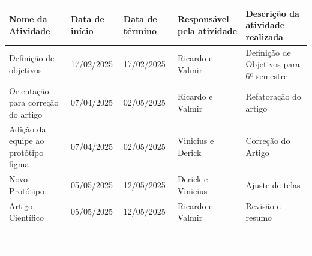 \documentclass[
landscape,
  a4paper,%
  12pt,%
  english,%
  brazilian,%
]{article}
\begin{document}
\begin{table}[]
  \centering
  \begin{tabular}{|l|l|l|l|l|}
  \hline
  Nome da Atividade & Data de início & Data de término & Responsável pela atividade & Descrição da atividade realizada \\ \hline
                    Definição de objetivos              &17/02/2025&17/02/2025  &Ricardo e Valmir &Definição de Objetivos para 6º semestre\\ \hline
                    Orientação para correção do artigo     &07/04/2025&02/05/2025  &Ricardo e Valmir &Refatoração do artigo\\ \hline
                    Adição da equipe ao protótipo figma &07/04/2025&02/05/2025  &Vinicius e Derick           &Correção do Artigo\\ \hline
                    Novo Protótipo                      &05/05/2025&12/05/2025  &Derick e Vinicius           &Ajuste de telas\\ \hline
                    Artigo Científico                   &05/05/2025&12/05/2025  &Ricardo e Valmir         &Revisão e resumo \\\hline

                    &                            &                &                 &                                  \\ \hline
                    &                            &                &                 &                                  \\ \hline
                    &                            &                &                 &                                  \\ \hline
                    &                            &                &                 &                                  \\ \hline
                    &                            &                &                 &                                  \\ \hline
                    &                            &                &                 &                                  \\ \hline
                    &                            &                &                 &                                  \\ \hline
                    &                            &                &                 &                                  \\ \hline
  \end{tabular}
  \end{table}
\end{document}
